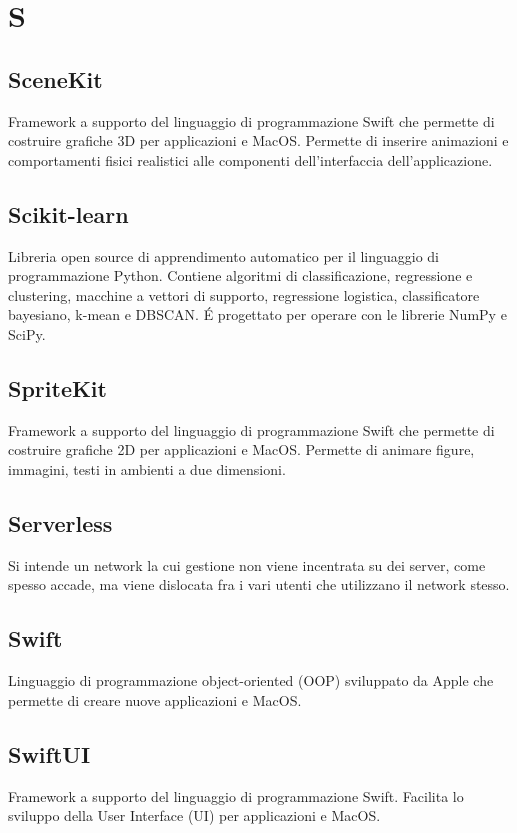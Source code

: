 \section*{S}
\markright{}
\subsection*{SceneKit}
Framework a supporto del linguaggio di programmazione Swift che permette di costruire grafiche 3D per applicazioni  e MacOS. Permette di inserire animazioni e comportamenti fisici realistici alle componenti dell'interfaccia dell'applicazione. 
\subsection*{Scikit-learn}
Libreria open source di apprendimento automatico per il linguaggio di programmazione Python. Contiene algoritmi di classificazione, regressione e clustering, macchine a vettori di supporto, regressione logistica, classificatore bayesiano, k-mean e DBSCAN. \'E progettato per operare con le librerie NumPy e SciPy. 
\subsection*{SpriteKit}
Framework a supporto del linguaggio di programmazione Swift che permette di costruire grafiche 2D per applicazioni  e MacOS. Permette di animare figure, immagini, testi in ambienti a due dimensioni.
\subsection*{Serverless}
Si intende un network la cui gestione non viene incentrata su dei server, come spesso accade, ma viene dislocata fra i vari utenti che utilizzano il network stesso.
\subsection*{Swift}
Linguaggio di programmazione object-oriented (OOP) sviluppato da Apple che permette di creare nuove applicazioni  e MacOS.  
\subsection*{SwiftUI}
Framework a supporto del linguaggio di programmazione Swift. Facilita lo sviluppo della User Interface (UI) per applicazioni  e MacOS.